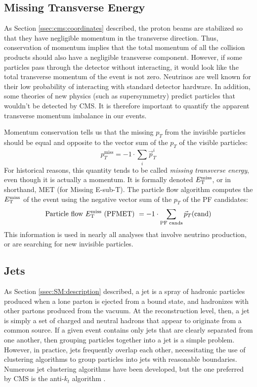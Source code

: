 \subsection{Missing Transverse Energy}
\label{ssec:cms:reco:met}

As Section \ref{ssec:cms:coordinates} described, the proton beams are
stabilized so that they have negligible momentum in the transverse
direction. Thus, conservation of momentum implies that
the total momentum of all the collision products should also
have a negligible transverse component. However, if some particles
pass through the detector without interacting, it would look like
the total transverse momentum of the event is not zero. Neutrinos are
well known for their low probability of interacting with standard
detector hardware. In addition, some theories of new physics (such
as supersymmetry) predict particles that wouldn't be detected by
CMS. It is therefore important to quantify the apparent transverse
momentum imbalance in our events.

Momentum conservation tells us that the missing $p_T$ from
the invisible particles should be equal and opposite to the vector sum
of the $p_T$ of the visible particles:
\begin{equation}
p_T^\text{miss} = -1 \cdot \sum_i \vec{p}_T^i
\end{equation}
For historical reasons, this quantity tends to be called \emph{missing
  transverse energy}, even though it is actually a momentum.
It is formally denoted $E_\text{T}^\text{miss}$, or in shorthand, MET (for
Missing E-sub-T). The particle flow algorithm computes the $E_\text{T}^\text{miss}$ of
the event using the negative vector sum of the $p_T$ of the PF
candidates:
\begin{equation}
\text{Particle flow } E_\text{T}^\text{miss} \text{ (PFMET) } =
-1 \cdot \sum_\text{PF cands} \vec{p}_T \text{(cand)}
\end{equation}
This information is used in nearly all analyses that involve
neutrino production, or are searching for new invisible particles.

\subsection{Jets}
\label{ssec:cms:reco:jets}

As Section \ref{ssec:SM:description} described, a jet is a spray
of hadronic particles produced when a lone parton is ejected
from a bound state, and hadronizes with other
partons produced from the vacuum. At the reconstruction level, then,
a jet is simply a set of charged and neutral hadrons that appear to
originate from a common source. If a given event contains only jets
that are clearly separated from one another, then grouping particles
together into a jet is a simple problem. However, in practice, jets
frequently overlap each other, necessitating the use of clustering
algorithms to group particles into jets with reasonable
boundaries. Numerous jet clustering algorithms have been developed,
but the one preferred by CMS is the anti-$k_t$ algorithm
\cite{antikt}.


